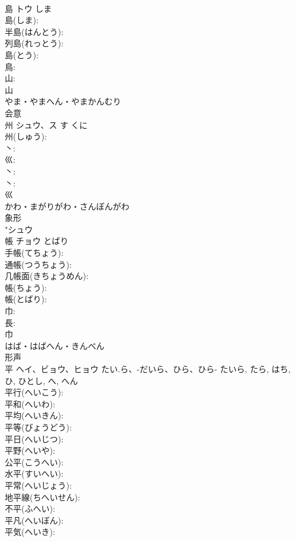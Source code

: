 \documentclass[8pt]{extreport}
\begin{document}
\begin{CJK}{UTF8}{min}
\\	島	トウ	しま		
\\	島(しま): 
\\	半島(はんとう): 
\\	列島(れっとう): 
\\	島(とう): 
\\	鳥: 
\\	山: 
\\	山	
\\	やま・やまへん・やまかんむり	
\\	会意 
\\	州	シュウ、ス	す	くに	
\\	州(しゅう): 
\\	丶: 
\\	巛: 
\\	丶: 
\\	丶: 
\\	巛	
\\	かわ・まがりがわ・さんぼんがわ	
\\	象形 
\\	"シュウ　
\\	帳	チョウ	とばり		
\\	手帳(てちょう): 
\\	通帳(つうちょう): 
\\	几帳面(きちょうめん): 
\\	帳(ちょう): 
\\	帳(とばり): 
\\	巾: 
\\	長: 
\\	巾	
\\	はば・はばへん・きんべん	
\\	形声 
\\	平	ヘイ、ビョウ、ヒョウ	たい.ら、-だいら、ひら、ひら-	たいら, たら, はち, ひ, ひとし, へ, へん	
\\	平行(へいこう): 
\\	平和(へいわ): 
\\	平均(へいきん): 
\\	平等(びょうどう): 
\\	平日(へいじつ): 
\\	平野(へいや): 
\\	公平(こうへい): 
\\	水平(すいへい): 
\\	平常(へいじょう): 
\\	地平線(ちへいせん): 
\\	不平(ふへい): 
\\	平凡(へいぼん): 
\\	平気(へいき): 

\end{CJK}
\end{document}
